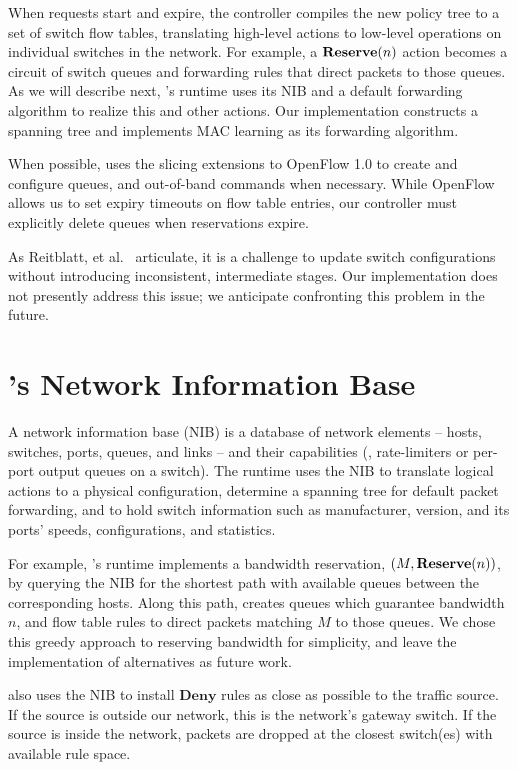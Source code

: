 When requests start and expire, the \sys controller compiles the new
policy tree to a set of switch flow tables, translating
high-level actions to low-level operations on individual
switches in the network. For example, a $\textbf{Reserve}(n)$ action
becomes a circuit of switch queues and forwarding rules that direct
packets to those queues.  As we will describe next, \sys's runtime
uses its NIB and a default forwarding algorithm to realize this and
other actions.  Our implementation constructs a spanning tree and
implements MAC learning as its forwarding algorithm.

When possible, \sys uses the slicing extensions to OpenFlow 1.0 to
create and configure queues, and out-of-band commands when necessary.  While
OpenFlow allows us to set expiry timeouts on flow table entries, our
controller must explicitly delete queues when reservations expire.

As Reitblatt, et al.~\cite{reitblatt12consistent} articulate, it is
a challenge to update switch configurations without introducing
inconsistent, intermediate stages. Our implementation does not
presently address this issue; we anticipate confronting this
problem in the future.

\section{\sys's Network Information Base}
\label{sec:NIB}

A network information base (NIB) is a database of network elements
-- hosts, switches, ports, queues, and links -- and their
capabilities (\eg, rate-limiters or per-port output queues on a
switch). The runtime uses the NIB to translate logical actions to a
physical configuration, determine a spanning tree for default packet
forwarding, and to hold switch information such as manufacturer,
version, and its ports' speeds, configurations, and statistics.

For example, \sys's runtime implements a bandwidth reservation,
$(M,\textbf{Reserve}(n))$, by querying the NIB for the shortest path
with available queues between the corresponding hosts.  Along this
path, \sys creates queues which guarantee bandwidth $n$, and flow
table rules to direct packets matching $M$ to those queues. We chose
this greedy approach to reserving bandwidth for simplicity, and
leave the implementation of alternatives as future work.

\sys also uses the NIB to install $\textbf{Deny}$ rules as close as
possible to the traffic source. If the source is outside our
network, this is the network's gateway switch. If the source is
inside the network, packets are dropped at the closest switch(es)
with available rule space.

